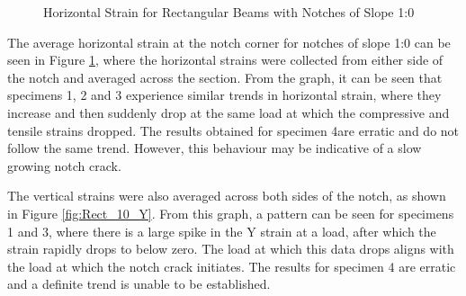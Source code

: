\documentclass[11pt,a4paper]{article}
\numberwithin{equation}{subsection}
\begin{document}
\begin{figure}[h]
	\begin{center}
	\end{center}
	\caption{Horizontal Strain for Rectangular Beams with Notches of Slope 1:0}
	\label{fig:Rect_10_Z}
\end{figure}
\pagebreak

\noindent
The average horizontal strain at the notch corner for notches of slope 1:0 can be seen in Figure \ref{fig:Rect_10_Z}, where the horizontal strains were collected from either side of the notch and averaged across the section. From the graph, it can be seen that specimens 1, 2 and 3 experience similar trends in horizontal strain, where they increase and then suddenly drop at the same load at which the compressive and tensile strains dropped. The results obtained for specimen 4are erratic and do not follow the same trend. However, this behaviour may be indicative of a slow growing notch crack.

\vspace*{\baselineskip}

\noindent
The vertical strains were also averaged across both sides of the notch, as shown in Figure \ref{fig:Rect_10_Y}. From this graph, a pattern can be seen for specimens 1 and 3, where there is a large spike in the Y strain at a load, after which the strain rapidly drops to below zero. The load at which this data drops aligns with the load at which the notch crack initiates. The results for specimen 4 are erratic and a definite trend is unable to be established. 

\vspace*{\baselineskip}
\end{document}
